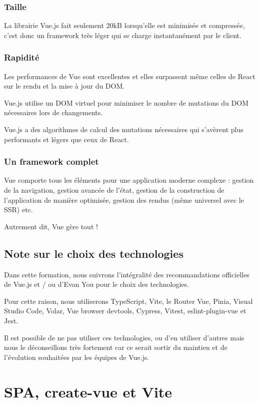\documentclass{article}
\begin{document}
\subsubsection{Taille}
La librairie Vue.js fait seulement 20kB lorsqu'elle est minimisée et compressée, c'est donc un framework très léger qui se charge instantanément par le client.

\subsubsection{Rapidité}
Les performances de Vue sont excellentes et elles surpassent même celles de React sur le rendu et la mise à jour du DOM.

Vue.js utilise un DOM virtuel pour minimiser le nombre de mutations du DOM nécessaires lors de changements.

Vue.js a des algorithmes de calcul des mutations nécessaires qui s'avèrent plus performants et légers que ceux de React.

\subsubsection{Un framework complet}
Vue comporte tous les éléments pour une application moderne complexe : gestion de la navigation, gestion avancée de l'état, gestion de la construction de l'application de manière optimisée, gestion des rendus (même universel avec le SSR) etc.

Autrement dit, Vue gère tout !

\subsection{Note sur le choix des technologies}
Dans cette formation, nous suivrons l'intégralité des recommandations officielles de Vue.js et / ou d'Evan You pour le choix des technologies.

Pour cette raison, nous utiliserons TypeScript, Vite, le Router Vue, Pinia, Visual Studio Code, Volar, Vue browser devtools, Cypress, Vitest, eslint-plugin-vue et Jest.

Il est possible de ne pas utiliser ces technologies, ou d'en utiliser d'autres mais nous le déconseillons très fortement car ce serait sortir du maintien et de l'évolution souhaitées par les équipes de Vue.js.


\section{SPA, create-vue et Vite}
\end{document}
